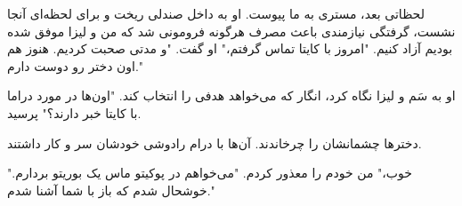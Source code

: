 لحظاتی بعد، مستری به ما پیوست. او به داخل صندلی ریخت و برای لحظه‌ای آنجا نشست، گرفتگی نیازمندی باعث مصرف هرگونه فرومونی شد که من و لیزا موفق شده بودیم آزاد کنیم. "امروز با کایتا تماس گرفتم،" او گفت. "و مدتی صحبت کردیم. هنوز هم اون دختر رو دوست دارم."

او به سَم و لیزا نگاه کرد، انگار که می‌خواهد هدفی را انتخاب کند. "اون‌ها در مورد دراما با کایتا خبر دارند؟" پرسید.

دخترها چشمانشان را چرخاندند. آن‌ها با درام رادوشی خودشان سر و کار داشتند.

"خوب،" من خودم را معذور کردم. "می‌خواهم در پوکیتو ماس یک بوریتو بردارم. خوشحال شدم که باز با شما آشنا شدم."